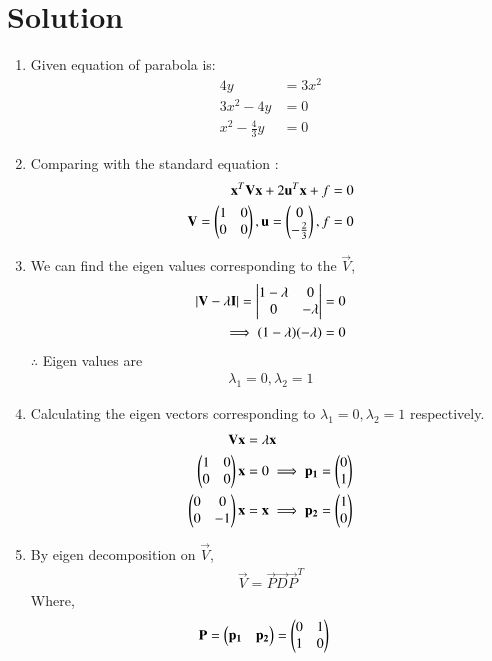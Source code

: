\documentclass[journal,12pt,twocolumn]{IEEEtran}
\begin{document}
\section{Solution}
\begin{enumerate}
\item Given equation of parabola is:
\begin{align}
 4y&=3x^2
 \\
 3x^2-4y&=0
 \\
 x^2-\frac{4}{3}y&=0
\end{align}
\item Comparing with the standard equation :
\begin{align}
\mathbf{x}^T\mathbf{V}\mathbf{x}+2\mathbf{u}^T\mathbf{x}+f=0 \label{eq1}
\\
\mathbf{V}=\begin{pmatrix}1&0\\0&0\end{pmatrix},\mathbf{u}=\begin{pmatrix}0\\-\frac{2}{3}\end{pmatrix},f=0 
\end{align}
\item We can find the eigen values corresponding to the $\vec{V}$,
\begin{align}
\lvert\mathbf{V} - \lambda\mathbf{I}\vert = \begin{vmatrix}1-\lambda & 0 \\ 0 & -\lambda\end{vmatrix} &= 0
\\
\implies (1- \lambda)(-\lambda) &= 0
\end{align}
$\therefore$ Eigen values are 
\begin{align}
\lambda_1 = 0 , \lambda_2 = 1
\end{align}
\item Calculating the eigen vectors corresponding to $\lambda_1 = 0 , \lambda_2 = 1$ respectively.
\begin{align}
\mathbf{V}\mathbf{x} &= \lambda\mathbf{x}
\\
\begin{pmatrix}1 & 0 \\ 0 & 0\end{pmatrix}\mathbf{x} &=0 \implies \mathbf{p_1} = \begin{pmatrix}0 \\ 1\end{pmatrix}
\\
\begin{pmatrix}0 & 0 \\ 0 & -1\end{pmatrix}\mathbf{x} &=\mathbf{x}  \implies \mathbf{p_2} = \begin{pmatrix}1 \\ 0\end{pmatrix}
\end{align}
\item By eigen decomposition on $\vec{V}$,
\begin{align}
\vec{V}=\vec{P}\vec{D}\vec{P}^T
\end{align}
Where,
\begin{align}
\vec{P} &= \myvec{\vec{p_1} & \vec{p_2}} = \myvec{0 & 1 \\ 1 & 0}

\end{align}
\end{enumerate}
\end{document}

